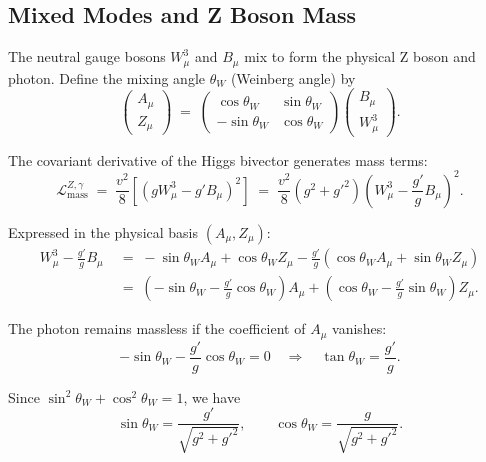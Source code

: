\documentclass[11pt,a4paper]{article}
\newcommand{\Lag}{\mathcal{L}}
\theoremstyle{definition}
\theoremstyle{plain}
\theoremstyle{remark}
\begin{document}
\subsection{Mixed Modes and Z Boson Mass}

The neutral gauge bosons $W_\mu^3$ and $B_\mu$ mix to form the physical Z boson and photon. Define the mixing angle $\theta_W$ (Weinberg angle) by
\begin{equation}
  \begin{pmatrix} A_\mu \\ Z_\mu \end{pmatrix}
  \;=\;
  \begin{pmatrix}
  \cos\theta_W & \sin\theta_W \\
  -\sin\theta_W & \cos\theta_W
  \end{pmatrix}
  \begin{pmatrix} B_\mu \\ W_\mu^3 \end{pmatrix}.
  \label{eq:mixing}
\end{equation}

The covariant derivative of the Higgs bivector generates mass terms:
\begin{equation}
  \Lag_{\text{mass}}^{Z,\gamma} \;=\; \frac{v^2}{8}\left[\left(gW_\mu^3 - g'B_\mu\right)^2\right]
  \;=\; \frac{v^2}{8}(g^2 + g'^2)\left(W_\mu^3 - \frac{g'}{g}B_\mu\right)^2.
\end{equation}

Expressed in the physical basis $(A_\mu, Z_\mu)$:
\begin{align}
  W_\mu^3 - \frac{g'}{g}B_\mu &\;=\; -\sin\theta_W A_\mu + \cos\theta_W Z_\mu - \frac{g'}{g}\left(\cos\theta_W A_\mu + \sin\theta_W Z_\mu\right) \\
  &\;=\; \left(-\sin\theta_W - \frac{g'}{g}\cos\theta_W\right)A_\mu + \left(\cos\theta_W - \frac{g'}{g}\sin\theta_W\right)Z_\mu.
\end{align}

The photon remains massless if the coefficient of $A_\mu$ vanishes:
\begin{equation}
  -\sin\theta_W - \frac{g'}{g}\cos\theta_W = 0
  \quad\Rightarrow\quad
  \tan\theta_W = \frac{g'}{g}.
\end{equation}

Since $\sin^2\theta_W + \cos^2\theta_W = 1$, we have
\begin{equation}
  \sin\theta_W = \frac{g'}{\sqrt{g^2 + g'^2}}, \qquad
  \cos\theta_W = \frac{g}{\sqrt{g^2 + g'^2}}.
\end{equation}
\end{document}

